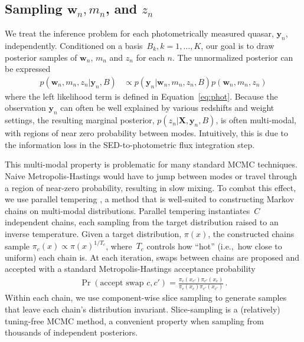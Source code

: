 \documentclass{article} %
\begin{document}
\subsection{Sampling $\mathbf{w}_n, m_n$, and $z_n$}
We treat the inference problem for each photometrically measured quasar, $\mathbf{y}_n$, independently.
Conditioned on a basis~${B_k, k=1,\dots, K}$, our goal is to draw posterior samples of $\mathbf{w}_n$, $m_n$ and $z_n$ for each $n$.  
The unnormalized posterior can be expressed
\begin{align}
  p(\mathbf{w}_n, m_n, z_n | \mathbf{y}_n, B)
  &\propto p(\mathbf{y}_n | \mathbf{w}_n, m_n, z_n, B) p(\mathbf{w}_n, m_n, z_n) \end{align}
where the left likelihood term is defined in Equation~\ref{eq:phot}.
Because the observation $\mathbf{y}_n$ can often be well explained by various redshifts and weight settings, the resulting marginal posterior, $p(z_n | \mathbf{X}, \mathbf{y}_n, B)$, is often multi-modal, with regions of near zero probability between modes.
Intuitively, this is due to the information loss in the SED-to-photometric flux integration step.

This multi-modal property is problematic for many standard MCMC techniques. 
Naive Metropolis-Hastings would have to jump between modes or travel through a region of near-zero probability, resulting in slow mixing.  
To combat this effect, we use parallel tempering \cite{brooks2011handbook}, a method that is well-suited to constructing Markov chains on multi-modal distributions.
Parallel tempering instantiates~$C$ independent chains, each sampling from the target distribution raised to an inverse temperature.
Given a target distribution, $\pi(x)$, the constructed chains sample 
${\pi_c(x) \propto \pi(x)^{1/T_c}}$,
where~$T_c$ controls how ``hot'' (i.e.,~how close to uniform) each chain is. 
At each iteration, swaps between chains are proposed and accepted with a standard Metropolis-Hastings acceptance probability 
\begin{align}
  \Pr(\text{accept swap } c, c') = \frac{ \pi_c(x_{c'}) \pi_{c'}(x_c) }{ \pi_c(x_c) \pi_{c'}(x_{c'}) } \, .
\end{align}
Within each chain, we use component-wise slice sampling \cite{neal2003slice} to generate samples that leave each chain's distribution invariant.  Slice-sampling is a (relatively) tuning-free MCMC method, a convenient property when sampling from thousands of independent posteriors.  


\end{document}
